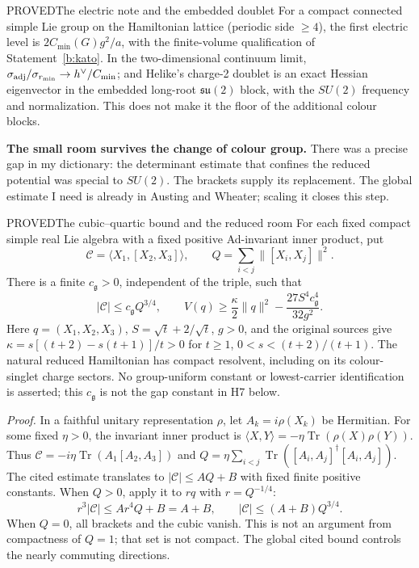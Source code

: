 \begin{claim}{PROVED}{The electric note and the embedded doublet}\label{b:everyGmode}
For a compact connected simple Lie group on the Hamiltonian lattice (periodic side $\ge4$), the first electric level
is $2C_{\min}(G)g^2/a$, with the finite-volume qualification of Statement~\ref{b:kato}. In the two-dimensional continuum limit,
$\sigma_{\rm adj}/\sigma_{r_{\min}}\to h^\vee/C_{\min}$; and Helike's charge-2 doublet is an exact Hessian eigenvector
in the embedded long-root $\mathfrak{su}(2)$ block, with the $SU(2)$ frequency and normalization. This does not make
it the floor of the additional colour blocks.
\end{claim}

\textbf{The small room survives the change of colour group.} There was a precise gap in my dictionary:
the determinant estimate that confines the reduced potential was special to $SU(2)$. The brackets supply
its replacement. The global estimate I need is already in Austing and Wheater; scaling it closes this step.

\begin{claim}{PROVED}{The cubic--quartic bound and the reduced room}\label{b:cubicquartic}
For each fixed compact simple real Lie algebra with a fixed positive Ad-invariant inner product, put
\[
\mathcal C=\langle X_1,[X_2,X_3]\rangle,\qquad
Q=\sum_{i<j}\|[X_i,X_j]\|^2.
\]
There is a finite $c_{\mathfrak g}>0$, independent of the triple, such that
\[
|\mathcal C|\le c_{\mathfrak g}Q^{3/4},\qquad
V(q)\ge\frac\kappa2\|q\|^2-\frac{27S^4c_{\mathfrak g}^4}{32g^2}.
\]
Here $q=(X_1,X_2,X_3)$, $S=\sqrt t+2/\sqrt t$, $g>0$, and the original sources give
$\kappa=s[(t+2)-s(t+1)]/t>0$ for $t\ge1$, $0<s<(t+2)/(t+1)$.
The natural reduced Hamiltonian has compact resolvent, including on its colour-singlet charge sectors.
No group-uniform constant or lowest-carrier identification is asserted; this $c_{\mathfrak g}$ is not
the gap constant in H7 below.
\end{claim}

\emph{Proof.} In a faithful unitary representation $\rho$, let $A_k=i\rho(X_k)$ be Hermitian.
For some fixed $\eta>0$, the invariant inner product is
$\langle X,Y\rangle=-\eta\operatorname{Tr}(\rho(X)\rho(Y))$.
Thus $\mathcal C=-i\eta\operatorname{Tr}(A_1[A_2,A_3])$ and
$Q=\eta\sum_{i<j}\operatorname{Tr}([A_i,A_j]^\dagger[A_i,A_j])$.
The cited estimate translates to $|\mathcal C|\le A Q+B$ with fixed finite positive constants.
When $Q>0$, apply it to $rq$ with $r=Q^{-1/4}$:
\[
r^3|\mathcal C|\le A r^4Q+B=A+B,
\qquad |\mathcal C|\le(A+B)Q^{3/4}.
\]
When $Q=0$, all brackets and the cubic vanish. This is not an argument from compactness of $Q=1$;
that set is not compact. The global cited bound controls the nearly commuting directions.

